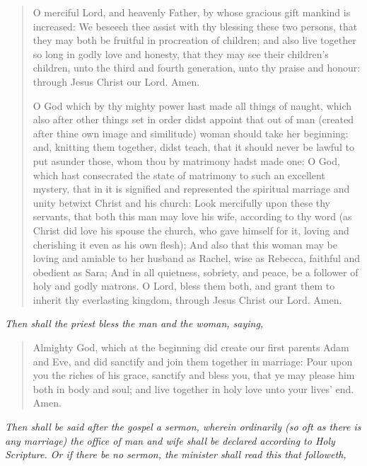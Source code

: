 \documentclass[
]{book}
\begin{document}
\begin{quote}
O merciful Lord, and heavenly Father, by whose gracious gift mankind is increased: We beseech thee assist with thy blessing these two persons, that they may both be fruitful in procreation of children; and also live together so long in godly love and honesty, that they may see their children's children, unto the third and fourth generation, unto thy praise and honour: through Jesus Christ our Lord. Amen.

O God which by thy mighty power hast made all things of naught, which also after other things set in order didst appoint that out of man (created after thine own image and similitude) woman should take her beginning: and, knitting them together, didst teach, that it should never be lawful to put asunder those, whom thou by matrimony hadst made one: O God, which hast consecrated the state of matrimony to such an excellent mystery, that in it is signified and represented the spiritual marriage and unity betwixt Christ and his church: Look mercifully upon these thy servants, that both this man may love his wife, according to thy word (as Christ did love his spouse the church, who gave himself for it, loving and cherishing it even as his own flesh); And also that this woman may be loving and amiable to her husband as Rachel, wise as Rebecca, faithful and obedient as Sara; And in all quietness, sobriety, and peace, be a follower of holy and godly matrons. O Lord, bless them both, and grant them to inherit thy everlasting kingdom, through Jesus Christ our Lord. Amen.
\end{quote}

\emph{Then shall the priest bless the man and the woman, saying,}

\begin{quote}
Almighty God, which at the beginning did create our first parents Adam and Eve, and did sanctify and join them together in marriage: Pour upon you the riches of his grace, sanctify and bless you, that ye may please him both in body and soul; and live together in holy love unto your lives' end. Amen.
\end{quote}

\emph{Then shall be said after the gospel a sermon, wherein ordinarily (so oft as there is any marriage) the office of man and wife shall be declared according to Holy Scripture. Or if there be no sermon, the minister shall read this that followeth,}
\end{document}
